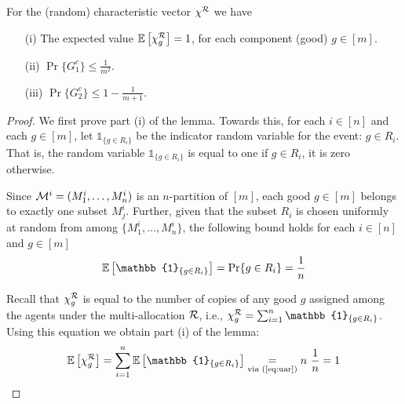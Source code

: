 \begin{lemma}
\label{lem:linftynorm} 
For the (random) characteristic vector $\chi^{\mathcal{R}}$ we have
\begin{enumerate}
\item[(i)] The expected value $\mathbb{E}\left[\chi^{\mathcal{R}}_g\right] = 1$, for each component (good) $g \in [m]$. 
\item[(ii)] $\Pr\{G_1^c\} \leq \frac{1}{m^2}.$
\item[(iii)] $\Pr\{G_2^c\} \leq 1 - \frac{1}{m+1}.$
\end{enumerate}
\end{lemma}
\begin{proof} 
We first prove part (i) of the lemma. Towards this, for each $i \in [n]$ and each $g \in [m]$, let $\mathbb{1}_{\{g \in R_i\}}$ be the indicator random variable for the event: $g \in R_i$. That is, the random variable $\mathbb{1}_{\{g \in R_i\}}$ is equal to one if $g \in R_i$, it is zero otherwise. 
 
Since $\mathcal{M}^i=(M^i_1,\ldots,M^i_n)$ is an $n$-partition of $[m]$, each good $g \in [m]$ belongs to exactly one subset $M^i_j$. Further, given that the subset $R_i$ is chosen uniformly at random from among $\{M^i_1,\ldots,M^i_n\}$, the following bound holds for each $i \in [n]$ and $g \in [m]$
\begin{align}
  \expval{\mathbb{1}_{\{g \in R_i\}}} = \Pr\{g \in R_i\} = \frac{1}{n}  \label{eq:uar}
\end{align}  

Recall that $\chi^{\mathcal{R}}_g$ is equal to the number of copies of any good $g$ assigned among the agents under the multi-allocation $\mathcal{R}$, i.e., $\chi^\calR_g = \sum_{i=1}^n \mathbb{1}_{\{g \in R_i\}}$. Using this equation we obtain part (i) of the lemma: 
\begin{align}
\expval{\chi^\calR_g} = \sum_{i=1}^n \expval{\mathbb{1}_{\{g \in R_i\}}}  \underset{\text{via (\ref{eq:uar})}}{=} n \  \frac{1}{n} = 1 \label{eqn:part-one-lemma-1} 
\end{align}


\end{proof}
